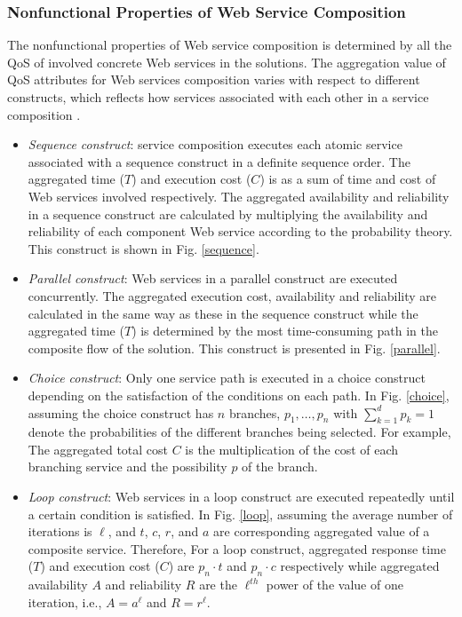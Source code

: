 \subsubsection{Nonfunctional Properties of Web Service Composition}
The nonfunctional properties of Web service composition is determined by all the QoS of involved concrete Web services in the solutions. The aggregation value of QoS attributes for Web services composition varies with respect to different constructs, which reflects how services associated with each other in a service composition \cite{zeng2003quality}.
\begin{itemize}

\item \emph{Sequence construct}: service composition executes each atomic service associated with a sequence construct in a definite sequence order. The aggregated time ($T$) and execution cost ($C$) is as a sum of time and cost of Web services involved respectively. The aggregated availability and reliability in a sequence construct are calculated by multiplying the availability and reliability of each component Web service according to the probability theory. This construct is shown in Fig. \ref{sequence}.
\item \emph{Parallel construct}: Web services in a parallel construct are executed concurrently. The aggregated execution cost, availability and reliability are calculated in the same way as these in the sequence construct while the aggregated time ($T$) is determined by the most time-consuming path in the composite flow of the solution. This construct is presented in Fig. \ref{parallel}.
\item \emph{Choice construct}: Only one service path is executed in a choice construct depending on the satisfaction of the conditions on each path. In Fig. \ref{choice}, assuming the choice construct has $n$ branches, $p_1,\ldots, p_n$ with  $\sum\limits^d_{k=1}p_k=1$ denote the probabilities of the different branches being selected. For example, The aggregated total cost $C$  is the multiplication of the cost of each branching service and the possibility $p$ of the branch.
\item \emph{Loop construct}: Web services in a loop construct are executed repeatedly until a certain condition is satisfied. In Fig. \ref{loop}, assuming the average number of iterations is $\ell$, and $t$, $c$, $r$, and $a$ are corresponding aggregated value of a composite service. Therefore, For a loop construct, aggregated response time ($T$) and execution cost ($C$) are $p_n \cdot t$ and $p_n \cdot c$ respectively while aggregated availability $A$ and reliability $R$ are the $\ell^{th}$ power of the value of one iteration, i.e., $A=a^\ell$ and $R=r^\ell$.
\end{itemize}


